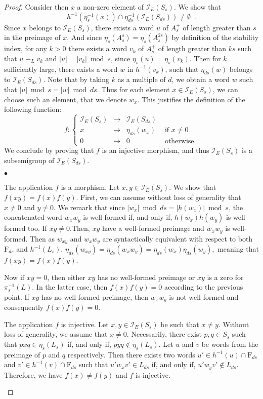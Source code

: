 \documentclass[submission,hidelink]{dmtcs-episciences}
\newcommand{\WFpp}[1]{\textrm{F}_{#1}}
\newcommand{\inv}{^{-1}}
\newenvironment{bulitem}
{\begin{list}{\rm $\bullet$}{\noindent \usecounter{enumi}\setlength{\topsep}{2pt}\setlength{\partopsep}{0pt}\setlength{\itemsep}{2pt}\setlength{\parsep}{0pt}\setlength{\leftmargin}{2.5em}\setlength{\labelwidth}{1.5em}\setlength{\labelsep}{0.5em}\setlength{\listparindent}{0pt}\setlength{\itemindent}{0pt}}}{\end{list}}
\newcommand{\tinf}[1]{\mathcal{I}_E(#1)}
\begin{document}
\begin{proof}
		Consider then $x$ a non-zero element of $\tinf{S_s}$.
		We show that
		$$h\inv(\eta_s\inv(x))\cap \eta\inv_{ds}(\tinf{S_{ds}})\neq \emptyset\enspace.$$
		Since $x$ belongs to $\tinf {S_s}$, there exists a word $u$
of $A_s^+$ of length greater than $s$ in the preimage of $x$.
		And since $\eta_s(A_s^s)=\eta_s(A_s^{2s})$ by definition of the stability index,
		for any $k>0$ there exists a word $v_k$ of $A_s^+$ of length greater than $ks$ such that
		$u\equiv_L v_k$ and $|u|=|v_k| \bmod s$, since
		$\eta_s(u)=\eta_s(v_k)$.
		Then for $k$ sufficiently large, there exists a word $w$ in $h\inv(v_{k})$,
		such that $\eta_{ds}(w)$ belongs to $\tinf{S_{ds}}$.
		Note that by taking $k$ as a multiple of $d$, we obtain a word $w$ such that
		$|u|\bmod s= |w|\bmod ds$.
		Thus for each element $x\in \tinf{S_s}$, we can choose such an element, that we denote $w_x$.
		This justifies the definition of the following function:
		$$f\colon\left\{\begin{array}{cccl}
		 \tinf{S_s}&\to& \tinf{S_{ds}}\\
		 x &\mapsto& \eta_{ds}(w_x)&\text{ if }x\neq0\\
		 0&\mapsto & 0&\text{ otherwise.}
		\end{array}\right.$$
		We conclude by proving that $f$ is an injective morphism, and thus
		$\tinf{S_s}$ is a subsemigroup of $\tinf{S_{ds}}$.
	\begin{bulitem}
		\item[The application $f$ is a morphism.] Let $x,y\in \tinf{S_s}$. We show that
		$f(xy)=f(x)f(y)$.
		First, we can assume without loss of generality that $x\neq 0$ and $y\neq 0$.
		We remark that since $|w_x|\bmod ds=|h(w_x)|\bmod s$,
		the concatenated word $w_xw_y$ is well-formed if, and only if,
		$h(w_x)h(w_y)$ is well-formed too.
		If $xy\neq 0$.Then, $xy$ have
		a well-formed preimage
		and $w_xw_y$ is well-formed.
		Then as $w_{xy}$ and $w_xw_y$ are syntactically equivalent with respect to
		both $\WFpp{ds}$ and $h^{-1}(L_s)$,
		$\eta_{ds}(w_{xy}) =\eta_{ds}(w_xw_y)=\eta_{ds}(w_x)\eta_{ds}(w_y),$ meaning that $f(xy)=f(x)f(y)$.

		Now if $xy=0$, then either $xy$ has no well-formed preimage or
		$xy$ is a zero for $\pi_s\inv(L)$.
		In the latter case, then $f(x)f(y)=0$ according to the previous point.
		If $xy$ has no well-formed preimage, then $w_xw_y$ is not well-formed
		and consequently $f(x)f(y)=0$.
		\item[The application $f$ is injective.]
		Let $x,y\in \tinf{S_s}$ be such that $x\neq y$. Without loss of generality, we  assume that $x\neq 0$.
		Necessarily, there exist $p,q\in S_s$ such that $pxq\in \eta_s(L_s)$ if, and only if, $pyq\not\in \eta_s(L_s)$.
		Let $u$ and $v$ be words from the preimage of $p$ and $q$ respectively.
		Then there exists two words $u'\in h^{-1}(u)\cap \WFpp{ds}$ and $v'\in h^{-1}(v)\cap\WFpp{ds}$ such that
		$u'w_xv'\in L_{ds}$ if, and only if, $u'w_yv'\not\in L_{ds}$. Therefore, we have $f(x)\neq f(y)$ and $f$ is injective.
	\end{bulitem}
	\end{proof}
\\
\end{document}
